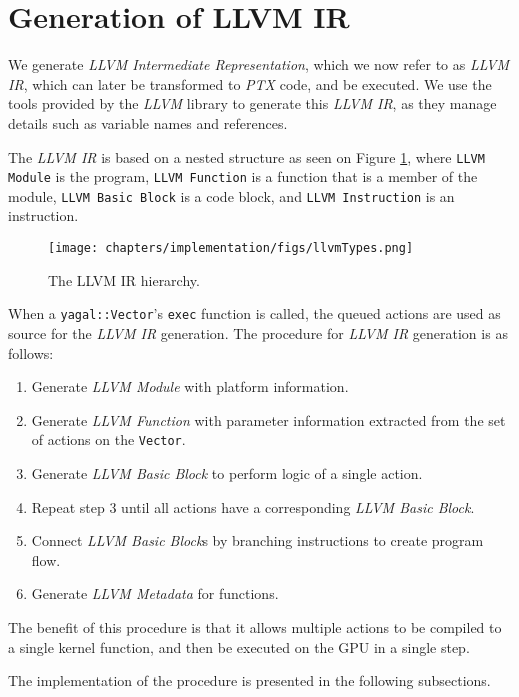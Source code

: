 \section{Generation of LLVM IR} \label{sec:actionToIr}
 We generate \textit{LLVM Intermediate Representation}, which we now refer to as \textit{LLVM IR}, which can later be transformed to \textit{PTX} code, and be executed. We use the tools provided by the \textit{LLVM} library to generate this \textit{LLVM IR}, as they manage details such as variable names and references.

The \textit{LLVM IR} is based on a nested structure as seen on Figure \ref{fig:llvmTypes}, where \texttt{LLVM Module} is the program, \texttt{LLVM Function} is a function that is a member of the module,  \texttt{LLVM Basic Block} is a code block, and \texttt{LLVM Instruction} is an instruction. 

\begin{figure}[!htb]
    \center
    \texttt{[image: chapters/implementation/figs/llvmTypes.png]}
    \caption{The LLVM IR hierarchy.}
    \label{fig:llvmTypes}
\end{figure}

When a \texttt{yagal::Vector}'s \texttt{exec} function is called, the queued actions are used as source for the \textit{LLVM IR} generation. The procedure for \textit{LLVM IR} generation is as follows:

\begin{enumerate}
\item Generate \textit{LLVM Module} with platform information.
\item Generate \textit{LLVM Function} with parameter information extracted from the set of actions on the \texttt{Vector}.
\item Generate \textit{LLVM Basic Block} to perform logic of a single action.
\item Repeat step 3 until all actions have a corresponding \textit{LLVM Basic Block}.
\item Connect \textit{LLVM Basic Block}s by branching instructions to create program flow.
\item Generate \textit{LLVM Metadata} for functions.
\end{enumerate}

The benefit of this procedure is that it allows multiple actions to be compiled to a single kernel function, and then be executed on the GPU in a single step.

The implementation of the procedure is presented in the following subsections.

